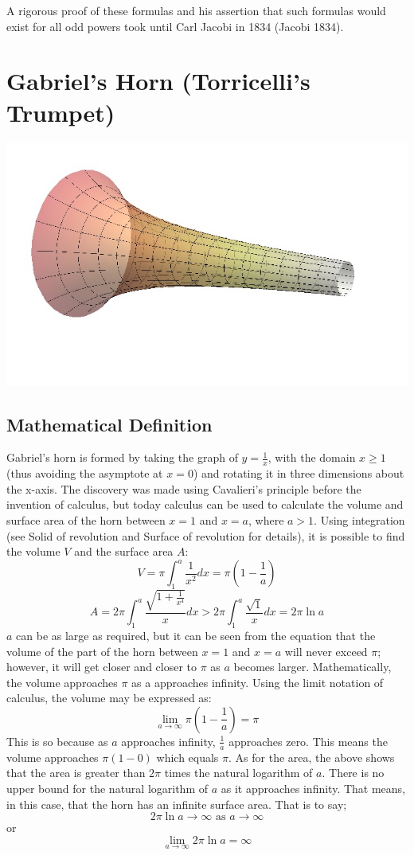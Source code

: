 \documentclass[10pt]{report}
\begin{document}
A rigorous proof of these formulas and his assertion that such formulas would exist for all odd powers took until Carl Jacobi in 1834 (Jacobi 1834).
\section{Gabriel's Horn (Torricelli's Trumpet)}
\includegraphics[scale=.5]{Gabriel_Horn}
\subsection{Mathematical Definition}
Gabriel's horn is formed by taking the graph of $y=\frac{1}{x}$, with the domain $x\geq 1$ (thus avoiding the asymptote at $x = 0$) and rotating it in three dimensions about the x-axis. The discovery was made using Cavalieri's principle before the invention of calculus, but today calculus can be used to calculate the volume and surface area of the horn between $x = 1$ and $x = a$, where $a > 1$. Using integration (see Solid of revolution and Surface of revolution for details), it is possible to find the volume $V$ and the surface area $A$:
$$V=\pi\int_1^a \frac{1}{x^2}dx = \pi(1-\frac{1}{a})$$
$$A=2\pi\int_1^a \frac{\sqrt{1+\frac{1}{x^4}}}{x} dx > 2\pi \int_1^a \frac{\sqrt{1}}{x}dx = 2\pi \ln a$$
$a$ can be as large as required, but it can be seen from the equation that the volume of the part of the horn between $x = 1$ and $x = a$ will never exceed $\pi$; however, it will get closer and closer to $\pi$ as $a$ becomes larger. Mathematically, the volume approaches $\pi$ as a approaches infinity. Using the limit notation of calculus, the volume may be expressed as:
$$\lim_{a\to\infty}\pi(1-\frac{1}{a}) = \pi$$
This is so because as $a$ approaches infinity, $\frac{1}{a}$ approaches zero. This means the volume approaches $\pi(1 - 0)$ which equals $\pi$.
As for the area, the above shows that the area is greater than $2\pi$ times the natural logarithm of $a$. There is no upper bound for the natural logarithm of $a$ as it approaches infinity. That means, in this case, that the horn has an infinite surface area. That is to say;
$$2\pi \ln a \to \infty \text{ as } a \to \infty$$
or
$$\lim_{a\to\infty}2\pi\ln a=\infty$$
\end{document}

